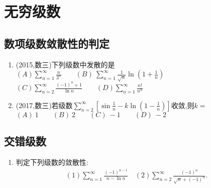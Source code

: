 \documentclass[12pt, a4paper, oneside, UTF8]{ctexbook}
\begin{document}

\else
\fi

\chapter{无穷级数}
\section{数项级数敛散性的判定}

\begin{enumerate}[label=\arabic*.]
    \item (2015,数三)下列级数中发散的是 \\
        $\displaystyle (A)\sum_{n=1}^{\infty}\frac{n}{3^n} \qquad(B)\ \sum_{n=1}^{\infty}\frac{1}{\sqrt{n}}\ln{\left(1+\frac{1}{n}\right)} $ \\
        $\displaystyle (C)\sum_{n=2}^{\infty}\frac{(-1)^n+1}{\ln n} \qquad (D)\sum_{n=1}^{\infty}\frac{n!}{n^n}$
    
    \begin{solution}
    \newpage
    \end{solution}
    
    \item (2017,数三)若级数$\displaystyle \sum_{n=2}^{\infty}\left[\sin\frac{1}{n}-k\ln\left(1-\frac{1}{n}\right)\right]$收敛,则$k=$ \\
    $(A)\ 1 \qquad (B)\ 2 \qquad (C)\ -1 \qquad (D)\ -2$
    
    \begin{solution}
    \newpage
    \end{solution}
\end{enumerate}

\section{交错级数}

\begin{enumerate}[label=\arabic*.,start=3]
    \item 判定下列级数的敛散性:
    \begin{align*}
        (1)\sum_{n=1}^{\infty}\frac{(-1)^{n-1}}{n-\ln n} \quad (2)\sum_{n=2}^{\infty}\frac{(-1)^n}{\sqrt{n}+(-1)^n}.
    \end{align*}
    
    \begin{solution}
    \newpage
    \end{solution}
\end{enumerate}
\end{document}
